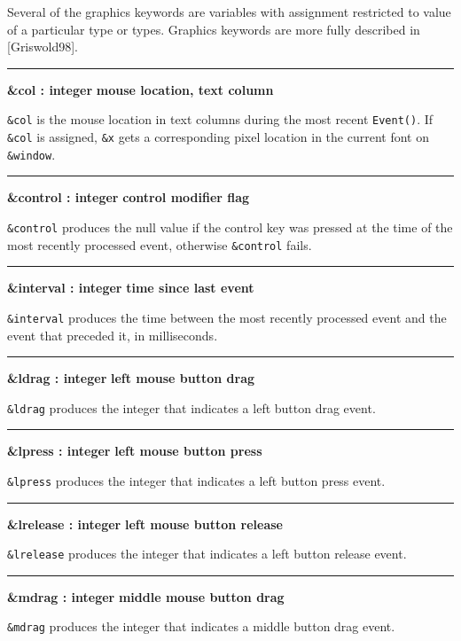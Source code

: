 Several of the graphics keywords are variables with assignment
restricted to value of a particular type or types. Graphics keywords
are more fully described in [Griswold98].

\bigskip\hrule\vspace{0.1cm}
\noindent
{\bf \&col : integer } \hfill {\bf mouse location, text column}

\noindent
\texttt{\&col} is the mouse location in text columns during the most
recent \texttt{Event()}. If \texttt{\&col} is assigned, \texttt{\&x}
gets a corresponding pixel location in the current font on
\texttt{\&window}.

\bigskip\hrule\vspace{0.1cm}
\noindent
{\bf \&control : integer } \hfill {\bf control modifier flag}

\noindent
\texttt{\&control} produces the null value if the control key was
pressed at the time of the most recently processed event, otherwise
\texttt{\&control} fails.

\bigskip\hrule\vspace{0.1cm}
\noindent
{\bf \&interval : integer } \hfill {\bf time since last event}

\noindent
\texttt{\&interval} produces the time between the most recently
processed event and the event that preceded it, in milliseconds.

\bigskip\hrule\vspace{0.1cm}
\noindent
{\bf \&ldrag : integer } \hfill {\bf left mouse button drag}

\noindent
\texttt{\&ldrag} produces the integer that indicates a left button drag
event.

\bigskip\hrule\vspace{0.1cm}
\noindent
{\bf \&lpress : integer } \hfill {\bf left mouse button press}

\noindent
\texttt{\&lpress} produces the integer that indicates a left button
press event.

\bigskip\hrule\vspace{0.1cm}
\noindent
{\bf \&lrelease : integer } \hfill {\bf left mouse button release}

\noindent
\texttt{\&lrelease} produces the integer that indicates a left button
release event.

\bigskip\hrule\vspace{0.1cm}
\noindent
{\bf \&mdrag : integer } \hfill {\bf  middle mouse button drag}

\noindent
\texttt{\&mdrag} produces the integer that indicates a middle button drag event.

